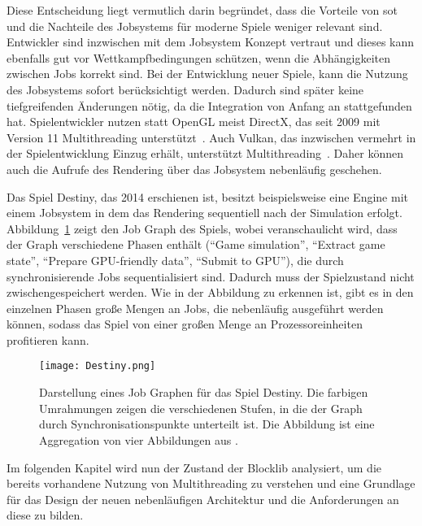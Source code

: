 Diese Entscheidung liegt vermutlich darin begründet, dass die Vorteile von \ac{sot}  und die Nachteile des Jobsystems für moderne Spiele weniger relevant sind. Entwickler sind inzwischen mit dem Jobsystem Konzept vertraut und dieses kann ebenfalls gut vor Wettkampfbedingungen schützen, wenn die Abhängigkeiten zwischen Jobs korrekt sind. Bei der Entwicklung neuer Spiele, kann die Nutzung des Jobsystems sofort berücksichtigt werden. Dadurch sind später keine tiefgreifenden Änderungen nötig, da die Integration von Anfang an stattgefunden hat. Spielentwickler nutzen statt OpenGL meist DirectX, das seit 2009 mit Version 11 Multithreading unterstützt~\cite{White2018}. Auch Vulkan, das inzwischen vermehrt in der Spielentwicklung Einzug erhält, unterstützt Multithreading~\cite{Schott2016}. Daher können auch die Aufrufe des Rendering über das Jobsystem nebenläufig geschehen.

Das Spiel Destiny, das 2014 erschienen ist, besitzt beispielsweise eine Engine mit einem Jobsystem in dem das Rendering sequentiell nach der Simulation erfolgt. Abbildung~\ref{fig:destiny-jobgraph} zeigt den Job Graph des Spiels, wobei veranschaulicht wird, dass der Graph verschiedene Phasen enthält (\enquote{Game simulation}, \enquote{Extract game state}, \enquote{Prepare GPU-friendly data}, \enquote{Submit to GPU}), die durch synchronisierende Jobs sequentialisiert sind. Dadurch muss der Spielzustand nicht zwischengespeichert werden. Wie in der Abbildung zu erkennen ist, gibt es in den einzelnen Phasen große Mengen an Jobs, die nebenläufig ausgeführt werden können, sodass das Spiel von einer großen Menge an Prozessoreinheiten profitieren kann.

\begin{figure}
	\texttt{[image: Destiny.png]}
	 \caption{Darstellung eines Job Graphen für das Spiel Destiny. Die farbigen Umrahmungen zeigen die verschiedenen Stufen, in die der Graph durch Synchronisationspunkte unterteilt ist. Die Abbildung ist eine Aggregation von vier Abbildungen aus \cite[S.~39~ff.]{Tatarchuk2014}.}\label{fig:destiny-jobgraph}
\end{figure}

Im folgenden Kapitel wird nun der Zustand der Blocklib analysiert, um die bereits vorhandene Nutzung von Multithreading zu verstehen und eine Grundlage für das Design der neuen nebenläufigen Architektur und die Anforderungen an diese zu bilden.
